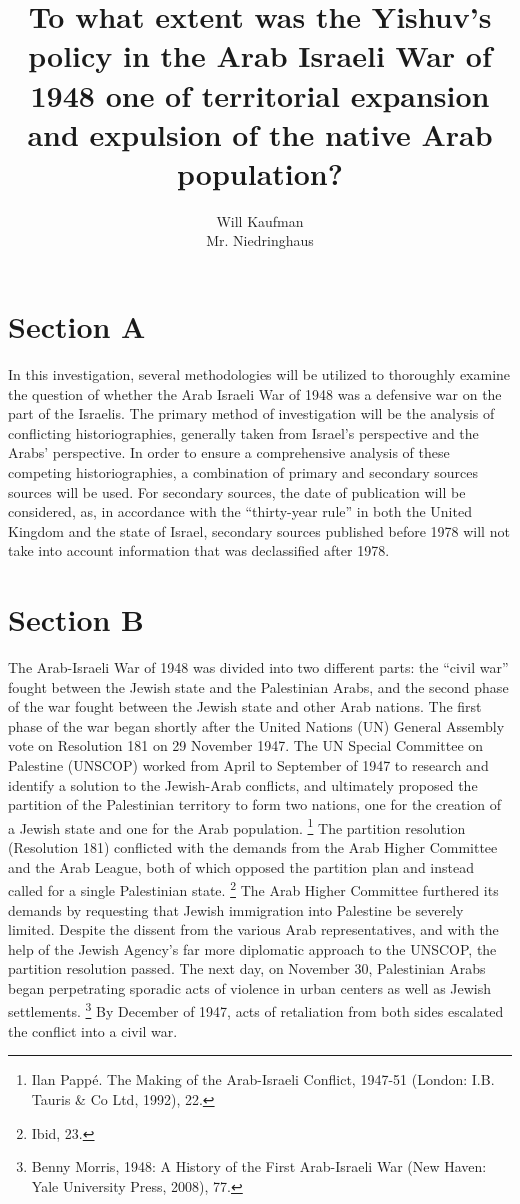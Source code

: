 \documentclass{turabian-researchpaper}
\begin{document}
\title{To what extent was the Yishuv's policy in the Arab Israeli War of 1948 one of territorial expansion and expulsion of the native Arab population?}

\author{Will Kaufman \\ Mr. Niedringhaus}
\maketitle

\section{Section A}
In this investigation, several methodologies will be utilized to thoroughly examine the question of whether the Arab Israeli War of 1948 was a defensive war on the part of the Israelis.  The primary method of investigation will be the analysis of conflicting historiographies, generally taken from Israel's perspective and the Arabs' perspective.  In order to ensure a comprehensive analysis of these competing historiographies, a combination of primary and secondary sources sources will be used.  For secondary sources, the date of publication will be considered, as, in accordance with the “thirty-year rule” in both the United Kingdom and the state of Israel, secondary sources published before 1978 will not take into account information that was declassified after 1978.

\section{Section B}
The Arab-Israeli War of 1948 was divided into two different parts: the “civil war” fought between the Jewish state and the Palestinian Arabs, and the second phase of the war fought between the Jewish state and other Arab nations.  The first phase of the war began shortly after the United Nations (UN) General Assembly vote on Resolution 181 on 29 November 1947.  The UN Special Committee on Palestine (UNSCOP) worked from April to September of 1947 to research and identify a solution to the Jewish-Arab conflicts, and ultimately proposed the partition of the Palestinian territory to form two nations, one for the creation of a Jewish state and one for the Arab population.
\footnote{Ilan Pappé.  The Making of the Arab-Israeli Conflict, 1947-51 (London: I.B. Tauris \& Co Ltd, 1992), 22.}
The partition resolution (Resolution 181) conflicted with the demands from the Arab Higher Committee and the Arab League, both of which opposed the partition plan and instead called for a single Palestinian state.
\footnote{Ibid, 23.}
The Arab Higher Committee furthered its demands by requesting that Jewish immigration into Palestine be severely limited.  Despite the dissent from the various Arab representatives, and with the help of the Jewish Agency's far more diplomatic approach to the UNSCOP, the partition resolution passed.  The next day, on November 30, Palestinian Arabs began perpetrating sporadic acts of violence in urban centers as well as Jewish settlements.
\footnote{Benny Morris, 1948: A History of the First Arab-Israeli War (New Haven: Yale University Press, 2008), 77.}
By December of 1947, acts of retaliation from both sides escalated the conflict into a civil war.
\end{document}
